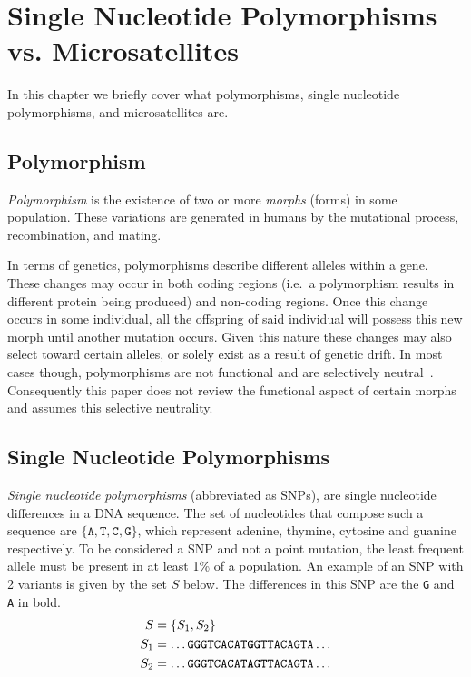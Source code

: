\chapter{Single Nucleotide Polymorphisms vs. Microsatellites}\label{ch:SNPvsMicrosatellites}
In this chapter we briefly cover what polymorphisms, single nucleotide polymorphisms, and microsatellites are.

\section{Polymorphism}\label{sec:polymorphism}
\emph{Polymorphism} is the existence of two or more \emph{morphs} (forms) in some population.
These variations are generated in humans by the mutational process, recombination, and mating.

In terms of genetics, polymorphisms describe different alleles within a gene.
These changes may occur in both coding regions (i.e.\ a polymorphism results in different protein being produced) and
non-coding regions.
Once this change occurs in some individual, all the offspring of said individual will possess this new morph until
another mutation occurs.
Given this nature these changes may also select toward certain alleles, or solely exist as a result of genetic drift.
In most cases though, polymorphisms are not functional and are selectively
neutral~\cite{wrightGeneticVariationPolymorphisms2005}.
Consequently this paper does not review the functional aspect of certain morphs and assumes this selective neutrality.

\section{Single Nucleotide Polymorphisms}\label{sec:singleNucleotidePolymorphism}
\emph{Single nucleotide polymorphisms} (abbreviated as SNPs), are single nucleotide differences in a DNA sequence.
The set of nucleotides that compose such a sequence are $\{ \texttt{A}, \texttt{T}, \texttt{C}, \texttt{G} \}$, which
represent adenine, thymine, cytosine and guanine respectively.
To be considered a SNP and not a point mutation, the least frequent allele must be present in at least 1\% of a
population.
An example of an SNP with 2 variants is given by the set $S$ below.
The differences in this SNP are the \texttt{G} and \texttt{A} in bold.
\begin{align*}
    S &= \{ S_1, S_2 \} \\
    S_1 &= \ldots \texttt{GGGTCACAT\textbf{G}GTTACAGTA} \ldots \\
    S_2 &= \ldots \texttt{GGGTCACAT\textbf{A}GTTACAGTA} \ldots
\end{align*}

